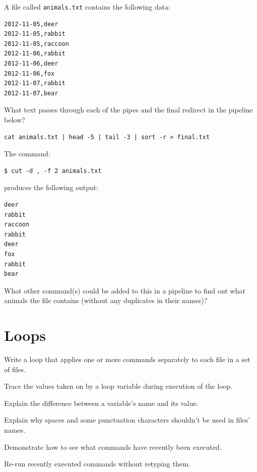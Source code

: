 \documentclass{book}
\begin{document}
\begin{challenge}
  A file called \texttt{animals.txt} contains the following data:

\begin{verbatim}
2012-11-05,deer
2012-11-05,rabbit
2012-11-05,raccoon
2012-11-06,rabbit
2012-11-06,deer
2012-11-06,fox
2012-11-07,rabbit
2012-11-07,bear
\end{verbatim}

  What text passes through each of the pipes and the final redirect in
  the pipeline below?

\begin{verbatim}
cat animals.txt | head -5 | tail -3 | sort -r > final.txt
\end{verbatim}
\end{challenge}

\begin{challenge}
  The command:

\begin{verbatim}
$ cut -d , -f 2 animals.txt
\end{verbatim}

  produces the following output:

\begin{verbatim}
deer
rabbit
raccoon
rabbit
deer
fox
rabbit
bear
\end{verbatim}

  What other command(s) could be added to this in a pipeline to find out
  what animals the file contains (without any duplicates in their
  names)?
\end{challenge}

\section{Loops}

\begin{objectives}
\begin{swcitemize}
\item
  Write a loop that applies one or more commands separately to each file
  in a set of files.
\item
  Trace the values taken on by a loop variable during execution of the
  loop.
\item
  Explain the difference between a variable's name and its value.
\item
  Explain why spaces and some punctuation characters shouldn't be used
  in files' names.
\item
  Demonstrate how to see what commands have recently been executed.
\item
  Re-run recently executed commands without retyping them.
\end{swcitemize}
\end{objectives}
\end{document}
